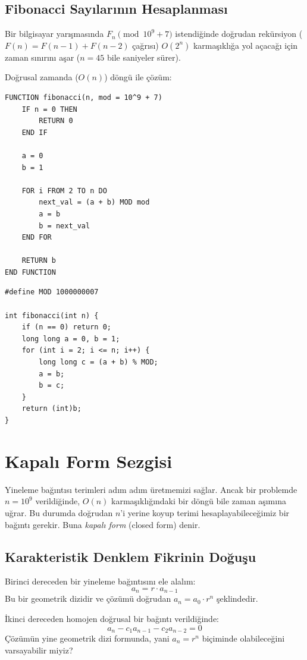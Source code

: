 \subsection{Fibonacci Sayılarının Hesaplanması}

Bir bilgisayar yarışmasında $F_n \pmod{10^9+7}$ istendiğinde doğrudan rekürsiyon ($F(n) = F(n-1) + F(n-2)$ çağrısı) $O(2^n)$ karmaşıklığa yol açacağı için zaman sınırını aşar ($n=45$ bile saniyeler sürer).

Doğrusal zamanda ($O(n)$) döngü ile çözüm:
\begin{lstlisting}
FUNCTION fibonacci(n, mod = 10^9 + 7)
    IF n = 0 THEN
        RETURN 0
    END IF

    a = 0
    b = 1

    FOR i FROM 2 TO n DO
        next_val = (a + b) MOD mod
        a = b
        b = next_val
    END FOR

    RETURN b
END FUNCTION\end{lstlisting}

\begin{lstlisting}[language=CTemel]
#define MOD 1000000007

int fibonacci(int n) {
    if (n == 0) return 0;
    long long a = 0, b = 1;
    for (int i = 2; i <= n; i++) {
        long long c = (a + b) % MOD;
        a = b;
        b = c;
    }
    return (int)b;
}
\end{lstlisting}

\section{Kapalı Form Sezgisi}

Yineleme bağıntısı terimleri adım adım üretmemizi sağlar. Ancak bir problemde $n = 10^9$ verildiğinde, $O(n)$ karmaşıklığındaki bir döngü bile zaman aşımına uğrar. Bu durumda doğrudan $n$'i yerine koyup terimi hesaplayabileceğimiz bir bağıntı gerekir. Buna \emph{kapalı form} (closed form) denir.

\subsection{Karakteristik Denklem Fikrinin Doğuşu}

Birinci dereceden bir yineleme bağıntısını ele alalım:
\[
a_n = r \cdot a_{n-1}
\]
Bu bir geometrik dizidir ve çözümü doğrudan $a_n = a_0 \cdot r^n$ şeklindedir.

İkinci dereceden homojen doğrusal bir bağıntı verildiğinde:
\[
a_n - c_1 a_{n-1} - c_2 a_{n-2} = 0
\]
Çözümün yine geometrik dizi formunda, yani $a_n = r^n$ biçiminde olabileceğini varsayabilir miyiz?


